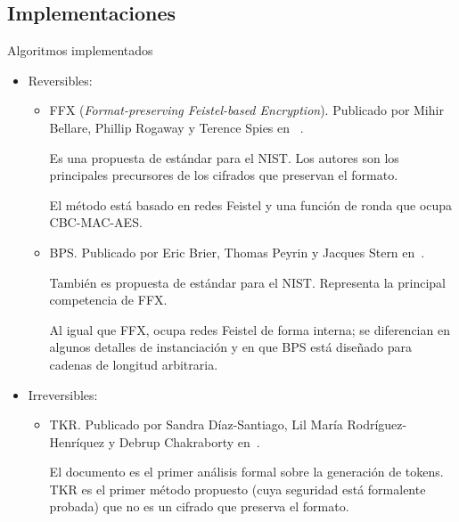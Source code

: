 %
%
%

\subsection{Implementaciones}

\begin{frame}{Algoritmos implementados}

  \begin{itemize}
    \item<1-> Reversibles:
      \begin{itemize}

        \item<2-> FFX (\textit{Format-preserving Feistel-based Encryption}).
          Publicado por Mihir Bellare, Phillip Rogaway y Terence Spies en
         ~\cite{ffx_1}.

          {
            Es una propuesta de estándar para el NIST. Los autores son los
            principales precursores de los cifrados que preservan el
            formato.

            El método está basado en redes Feistel y una función de ronda
            que ocupa CBC-MAC-AES.
          }

        \item<3-> BPS. Publicado por Eric Brier, Thomas Peyrin y Jacques
          Stern en~\cite{bps}.

          {
            También es propuesta de estándar para el NIST. Representa la
            principal competencia de FFX.

            Al igual que FFX, ocupa redes Feistel de forma interna; se
            diferencian en algunos detalles de instanciación y en que
            BPS está diseñado para cadenas de longitud arbitraria.
          }

      \end{itemize}
    \item<4-> Irreversibles:
      \begin{itemize}

        \item<5-> TKR. Publicado por Sandra Díaz-Santiago, Lil María
          Rodríguez-Henríquez y Debrup Chakraborty en~\cite{doc_sandra}.

          {
            El documento es el primer análisis formal sobre la generación de
            tokens. TKR es el primer método propuesto (cuya seguridad está
            formalente probada) que no es un cifrado que preserva el formato.
          }


\end{itemize}
\end{itemize}
\end{frame}

